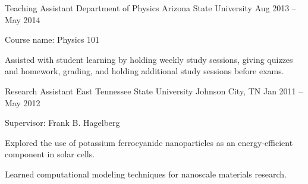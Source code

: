 \begin{cventries}
\cventry
    {Teaching Assistant}
    {Department of Physics}
    {Arizona State University}
    {Aug 2013 -- May 2014}
    {
    \begin{cvitems}
        \item {Course name: Physics 101}
        \item {Assisted with student learning by holding weekly study sessions, giving quizzes and homework, grading, and holding additional study sessions before exams.}
    \end{cvitems}
    }

\cventry
    {Research Assistant}
    {East Tennessee State University}
    {Johnson City, TN}
    {Jan 2011 -- May 2012}
    {
    \begin{cvitems}
        \item {Supervisor: Frank B. Hagelberg}
        \item {Explored the use of potassium ferrocyanide nanoparticles as an energy-efficient component in solar cells.}
        \item {Learned computational modeling techniques for nanoscale materials research.}
    \end{cvitems}
    }

\end{cventries}
